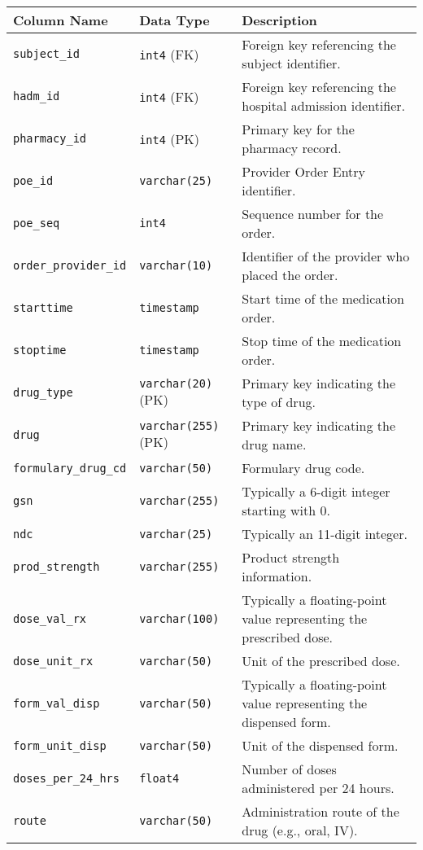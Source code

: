 \documentclass[a4paper,12pt]{article}
\begin{document}
\begin{table}[h]
    \centering
    \small
    \begin{tabularx}{\textwidth}{|l|l|X|}
        \hline
        \textbf{Column Name} & \textbf{Data Type} & \textbf{Description} \\
        \hline
        \texttt{subject\_id} & \texttt{int4} (FK) & Foreign key referencing the subject identifier. \\
        \texttt{hadm\_id} & \texttt{int4} (FK) & Foreign key referencing the hospital admission identifier. \\
        \texttt{pharmacy\_id} & \texttt{int4} (PK) & Primary key for the pharmacy record. \\
        \texttt{poe\_id} & \texttt{varchar(25)} & Provider Order Entry identifier. \\
        \texttt{poe\_seq} & \texttt{int4} & Sequence number for the order. \\
        \texttt{order\_provider\_id} & \texttt{varchar(10)} & Identifier of the provider who placed the order. \\
        \texttt{starttime} & \texttt{timestamp} & Start time of the medication order. \\
        \texttt{stoptime} & \texttt{timestamp} & Stop time of the medication order. \\
        \texttt{drug\_type} & \texttt{varchar(20)} (PK) & Primary key indicating the type of drug. \\
        \texttt{drug} & \texttt{varchar(255)} (PK) & Primary key indicating the drug name. \\
        \texttt{formulary\_drug\_cd} & \texttt{varchar(50)} & Formulary drug code. \\
        \texttt{gsn} & \texttt{varchar(255)} & Typically a 6-digit integer starting with 0. \\
        \texttt{ndc} & \texttt{varchar(25)} & Typically an 11-digit integer. \\
        \texttt{prod\_strength} & \texttt{varchar(255)} & Product strength information. \\
        \texttt{dose\_val\_rx} & \texttt{varchar(100)} & Typically a floating-point value representing the prescribed dose. \\
        \texttt{dose\_unit\_rx} & \texttt{varchar(50)} & Unit of the prescribed dose. \\
        \texttt{form\_val\_disp} & \texttt{varchar(50)} & Typically a floating-point value representing the dispensed form. \\
        \texttt{form\_unit\_disp} & \texttt{varchar(50)} & Unit of the dispensed form. \\
        \texttt{doses\_per\_24\_hrs} & \texttt{float4} & Number of doses administered per 24 hours. \\
        \texttt{route} & \texttt{varchar(50)} & Administration route of the drug (e.g., oral, IV). \\
        \hline
    \end{tabularx}
\end{table}
\end{document}
